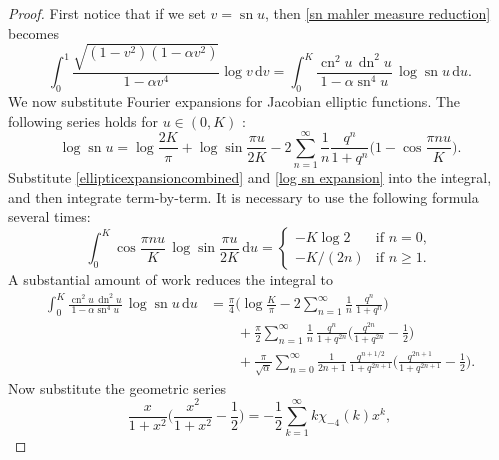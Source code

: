 \documentclass[12pt,reqno]{amsart}
\theoremstyle{remark}
\begin{document}
\begin{proof}
First notice that if we set $v={\operatorname{sn}} u$, then
\eqref{sn mahler measure reduction} becomes
\begin{equation*}
\int_{0}^{1}\frac{\sqrt{(1-v^2)(1-\alpha v^2)}}{1-\alpha v^4}\log v\,{{\mathrm d}} v
=\int_{0}^{K}\frac{{\operatorname{cn}}^2u\,{\operatorname{dn}}^2u}{1-\alpha{\operatorname{sn}}^4u}\,\log{\operatorname{sn}} u\,{{\mathrm d}} u.
\end{equation*}
We now substitute Fourier expansions for Jacobian elliptic
functions.  The following series holds for $u\in(0,K)$
\cite[pg.~917]{GR}:
\begin{equation}\label{log sn expansion}
\log{\operatorname{sn}} u=\log\frac{2K}\pi+\log\sin\frac{\pi u}{2K}
-2\sum_{n=1}^{\infty}\frac{1}{n}\frac{q^n}{1+q^n}\biggl(1-\cos\frac{\pi n u}{K}\biggr).
\end{equation}
Substitute \eqref{ellipticexpansioncombined} and \eqref{log sn
expansion} into the integral, and then integrate term-by-term.  It
is necessary to use the following formula several times:
\begin{equation*}
\int_{0}^{K}\cos\frac{\pi n u}{K}\,\log\sin\frac{\pi u}{2K}\,{{\mathrm d}} u=\begin{cases}
-K\log 2 &\text{if $n=0$},\\
-K/(2n) &\text{if $n\ge 1$}.
\end{cases}
\end{equation*}
A substantial amount of work reduces the integral to
\begin{equation*}
\begin{split}
\int_{0}^{K}\frac{{\operatorname{cn}}^2u\,{\operatorname{dn}}^2u}{1-\alpha{\operatorname{sn}}^4u}\,\log{\operatorname{sn}} u\,{{\mathrm d}} u
&=\frac{\pi}{4}\biggl(\log\frac K\pi-2\sum_{n=1}^{\infty}\frac{1}{n}\,\frac{q^n}{1+q^n}\biggr)
\\ &\qquad
+\frac{\pi}{2}\sum_{n=1}^{\infty}\frac{1}{n}\,\frac{q^n}{1+q^{2n}}\biggl(\frac{q^{2n}}{1+q^{2n}}-\frac{1}{2}\biggr)
\\ &\qquad
+\frac{\pi}{\sqrt{\alpha}}\sum_{n=0}^{\infty}\frac{1}{2n+1}\,\frac{q^{n+1/2}}{1+q^{2n+1}}
\biggl(\frac{q^{2n+1}}{1+q^{2n+1}}-\frac{1}{2}\biggr).
\end{split}
\end{equation*}
Now substitute the geometric series
\begin{equation*}
\frac{x}{1+x^2}\biggl(\frac{x^2}{1+x^2}-\frac{1}{2}\biggr)
=-\frac{1}{2}\sum_{k=1}^{\infty}k\chi_{-4}(k)x^k,
\end{equation*}

\end{proof}
\end{document}
